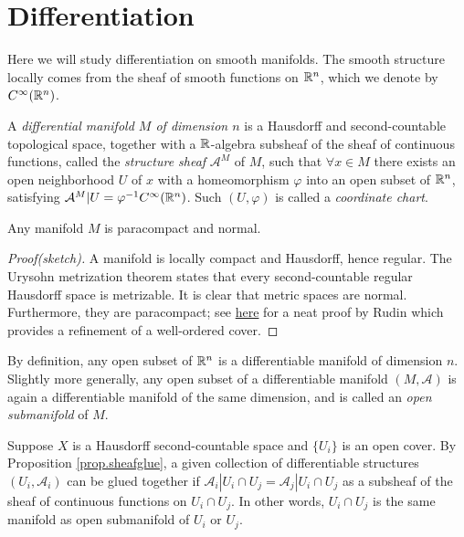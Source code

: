 \section{Differentiation}

Here we will study differentiation on smooth manifolds. The smooth structure locally comes from the sheaf of smooth functions on $\mathbb{R}^n$, which we denote by $C^\infty(\mathbb{R}^n)$.

\begin{definition}
    A \emph{differential manifold $M$ of dimension $n$} is a Hausdorff and second-countable topological space, together with a $\mathbb{R}$-algebra subsheaf of the sheaf of continuous functions, called the \emph{structure sheaf} $\mathcal{A}^M$ of $M$, such that $\forall x\in M$ there exists an open neighborhood $U$ of $x$ with a homeomorphism $\varphi$ into an open subset of $\mathbb{R}^n$, satisfying $\mathcal{A}^M|U=\varphi^{-1}C^\infty(\mathbb{R}^n)$. Such $(U,\varphi)$ is called a \emph{coordinate chart}.
\end{definition}

\begin{proposition}\label{prop.maniparacompact}
    Any manifold $M$ is paracompact and normal.
\end{proposition}

\begin{proof}[Proof(sketch)]
    A manifold is locally compact and Hausdorff, hence regular. The Urysohn metrization theorem states that every second-countable regular Hausdorff space is metrizable. It is clear that metric spaces are normal. Furthermore, they are paracompact; see \href{https://www.ams.org/journals/proc/1969-020-02/S0002-9939-1969-0236876-3/S0002-9939-1969-0236876-3.pdf}{here} for a neat proof by Rudin which provides a refinement of a well-ordered cover.
\end{proof}

\begin{definition}
    By definition, any open subset of $\mathbb{R}^n$ is a differentiable manifold of dimension $n$. Slightly more generally, any open subset of a differentiable manifold $(M,\mathcal{A})$ is again a differentiable manifold of the same dimension, and is called an \emph{open submanifold} of $M$.
\end{definition}

Suppose $X$ is a Hausdorff second-countable space and $\{U_i\}$ is an open cover. By Proposition \ref{prop.sheafglue}, a given collection of differentiable structures $(U_i,\mathcal{A}_i)$ can be glued together if $\mathcal{A}_i|U_i\cap U_j=\mathcal{A}_j|U_i\cap U_j$ as a subsheaf of the sheaf of continuous functions on $U_i\cap U_j$. In other words, $U_i\cap U_j$ is the same manifold as open submanifold of $U_i$ or $U_j$.

